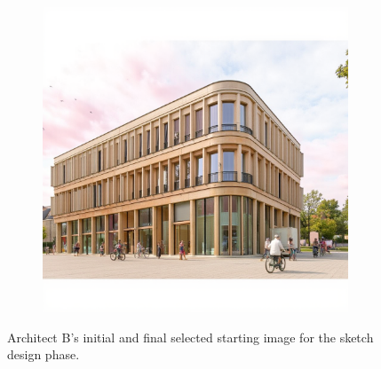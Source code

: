 \begin{figure}[H]
\begin{subfigure}[b]{0.3\textwidth}
        \includegraphics[width=\textwidth]{Images/Methodology/Evaluation sessions/LAVA_Fixed-images/1-sketch_design/Met_lora_00026_.png}
        \caption{}
        \label{fig:B-sketch-selected-b}
    \end{subfigure}
    \caption{Architect B's initial and final selected starting image for the sketch design phase.}
    \label{fig:B-sketch-selected}
\end{figure}
